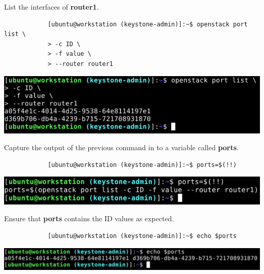 \documentclass[letterpaper, 12pt]{article}
\begin{document}
\begin{enumerate}
    \begin{labstep}
        List the interfaces of \textbf{router1}.
        \begin{lstlisting}
            [ubuntu@workstation (keystone-admin)]:~$ openstack port list \
            > -c ID \
            > -f value \
            > --router router1
        \end{lstlisting}

        \begin{center}
            \includegraphics[width=\linewidth]{images/part9/step3.png}
        \end{center}
    \end{labstep}

    \begin{labstep}
        Capture the output of the previous command in to a variable called \textbf{ports}.
        \begin{lstlisting}
            [ubuntu@workstation (keystone-admin)]:~$ ports=$(!!)
        \end{lstlisting}

        \begin{center}
            \includegraphics[width=\linewidth]{images/part9/step4.png}
        \end{center}
    \end{labstep}

    \begin{labstep}
        Ensure that \textbf{ports} contains the ID values as expected.
        \begin{lstlisting}
            [ubuntu@workstation (keystone-admin)]:~$ echo $ports
        \end{lstlisting}

        \begin{center}
            \includegraphics[width=\linewidth]{images/part9/step5.png}
        \end{center}
    \end{labstep}


\end{enumerate}
\end{document}
